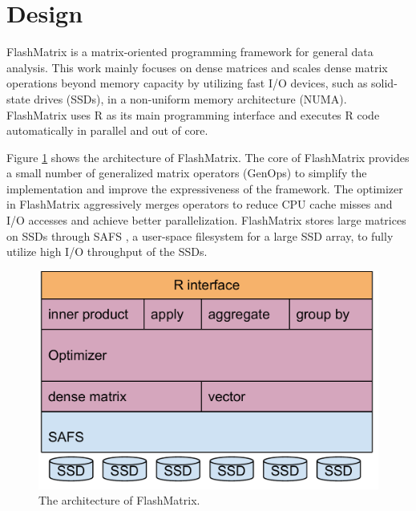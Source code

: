 \section{Design}

FlashMatrix is a matrix-oriented programming framework for general data analysis.
This work mainly focuses on dense matrices and scales
dense matrix operations beyond memory capacity by utilizing fast I/O devices,
such as solid-state drives (SSDs), in a non-uniform memory architecture (NUMA).
FlashMatrix uses R as its main programming interface and executes R code
automatically in parallel and out of core.

Figure \ref{fig:arch} shows the architecture of FlashMatrix. The core of
FlashMatrix provides a small number of generalized matrix operators (GenOps)
to simplify the implementation and improve the expressiveness of
the framework. The optimizer in FlashMatrix aggressively merges operators to
reduce CPU cache misses and I/O accesses and achieve better parallelization.
FlashMatrix stores large matrices on SSDs through SAFS \cite{safs},
a user-space filesystem for a large SSD array, to fully utilize high I/O
throughput of the SSDs.

\begin{figure}
\centering
\includegraphics[scale=0.3]{./architecture.pdf}
\caption{The architecture of FlashMatrix.}
\label{fig:arch}
\end{figure}

